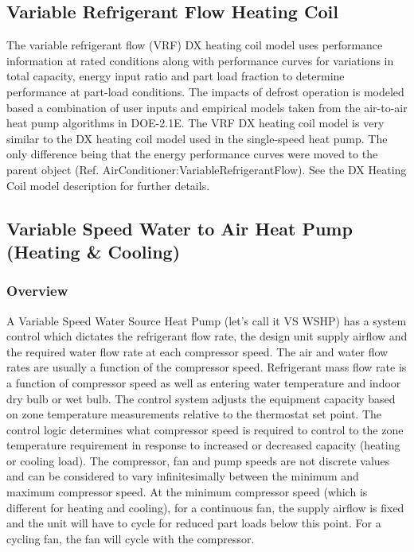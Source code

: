 \subsection{Variable Refrigerant Flow Heating Coil}\label{variable-refrigerant-flow-heating-coil}

The variable refrigerant flow (VRF) DX heating coil model uses performance information at rated conditions along with performance curves for variations in total capacity, energy input ratio and part load fraction to determine performance at part-load conditions. The impacts of defrost operation is modeled based a combination of user inputs and empirical models taken from the air-to-air heat pump algorithms in DOE-2.1E. The VRF DX heating coil model is very similar to the DX heating coil model used in the single-speed heat pump. The only difference being that the energy performance curves were moved to the parent object (Ref. AirConditioner:VariableRefrigerantFlow). See the DX Heating Coil model description for further details.

\subsection{Variable Speed Water to Air Heat Pump (Heating \& Cooling)}\label{variable-speed-water-to-air-heat-pump-heating-cooling}

\subsubsection{Overview}\label{overview-13}

A Variable Speed Water Source Heat Pump (let's call it VS WSHP) has a system control which dictates the refrigerant flow rate, the design unit supply airflow and the required water flow rate at each compressor speed. The air and water flow rates are usually a function of the compressor speed. Refrigerant mass flow rate is a function of compressor speed as well as entering water temperature and indoor dry bulb or wet bulb. The control system adjusts the equipment capacity based on zone temperature measurements relative to the thermostat set point. The control logic determines what compressor speed is required to control to the zone temperature requirement in response to increased or decreased capacity (heating or cooling load). The compressor, fan and pump speeds are not discrete values and can be considered to vary infinitesimally between the minimum and maximum compressor speed. At the minimum compressor speed (which is different for heating and cooling), for a continuous fan, the supply airflow is fixed and the unit will have to cycle for reduced part loads below this point. For a cycling fan, the fan will cycle with the compressor.

